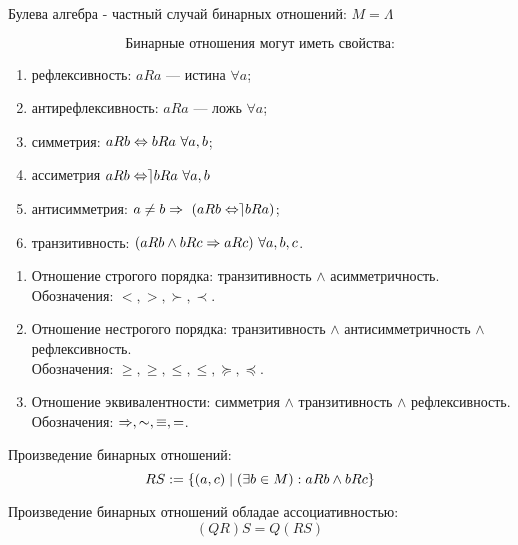 \documentclass{article}
\begin{document}
\begin{enumerate}
Булева алгебра - частный случай бинарных отношений: $M=\Lambda$

$$\text{Бинарные отношения могут иметь свойства:}$$
\begin{enumerate}[1)]
    \item рефлексивность: $aRa$ --- истина $\forall a$;
    \item антирефлексивность: $aRa$ --- ложь $\forall a$;
    \item симметрия: $aRb \Leftrightarrow bRa \ \forall a, b$;
    \item ассиметрия $aRb \Lrarr \rceil bRa \ \forall a, b$
    \item антисимметрия: $a\neq b \Rightarrow \ (aRb \Leftrightarrow \rceil bRa)$;
    \item транзитивность: $(aRb \land bRc \Rightarrow aRc) \ \forall a, b, c$.   
\end{enumerate}

\begin{enumerate}[1]
    \item Отношение строгого порядка: транзитивность $\land$ асимметричность. \\ Обозначения: $<, >, \succ, \prec$.
    \item Отношение нестрогого порядка: транзитивность $\land$ антисимметричность $\land$ рефлексивность. \\ Обозначения: $\ge, \geqslant, \le, \leqslant, \succeq, \preceq$.
    \item Отношение эквивалентности: симметрия $\land$ транзитивность $\land$ рефлексивность. \\ Обозначения: $\Rightarrow, \sim, \equiv, =$.
\end{enumerate}

Произведение бинарных отношений: $$RS:=\{(a, c)\;|\;(\exists b \in M): aRb \land bRc\}$$

\theorem 

Произведение бинарных отношений обладае ассоциативностью: $$(QR)S=Q(RS)$$




    
\end{enumerate}
\end{document}
